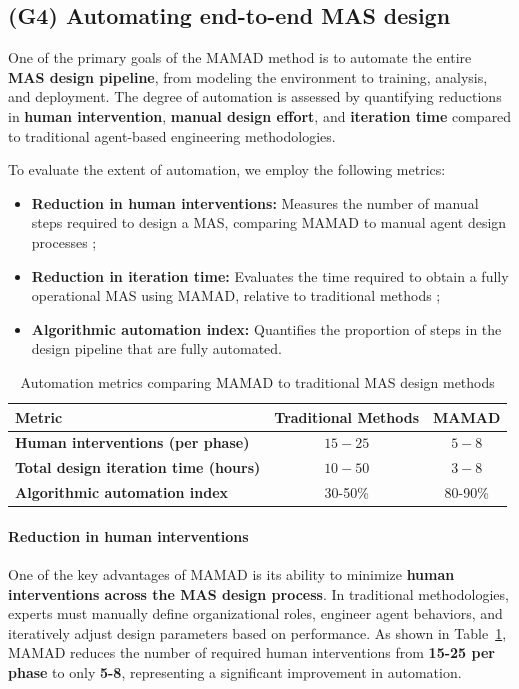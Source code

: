 \documentclass[journal]{IEEEtai}
\begin{document}
\subsection{(G4) Automating end-to-end MAS design}

One of the primary goals of the MAMAD method is to automate the entire \textbf{MAS design pipeline}, from modeling the environment to training, analysis, and deployment. The degree of automation is assessed by quantifying reductions in \textbf{human intervention}, \textbf{manual design effort}, and \textbf{iteration time} compared to traditional agent-based engineering methodologies.

To evaluate the extent of automation, we employ the following metrics:

\begin{itemize}
    \item \textbf{Reduction in human interventions:} Measures the number of manual steps required to design a MAS, comparing MAMAD to manual agent design processes ;
    \item \textbf{Reduction in iteration time:} Evaluates the time required to obtain a fully operational MAS using MAMAD, relative to traditional methods ;
    \item \textbf{Algorithmic automation index:} Quantifies the proportion of steps in the design pipeline that are fully automated.
\end{itemize}

\begin{table}[h!]
    \centering
    \caption{Automation metrics comparing MAMAD to traditional MAS design methods}
    \begin{tabular}{|l|c|c|}
        \hline
        \textbf{Metric} & \textbf{Traditional Methods} & \textbf{MAMAD} \\
        \hline
        \textbf{Human interventions (per phase)} & $15 - 25$ & $5 - 8$ \\
        \hline
        \textbf{Total design iteration time (hours)} & $10 - 50$ & $3 - 8$ \\
        \hline
        \textbf{Algorithmic automation index} & 30-50\% & 80-90\% \\
        \hline
    \end{tabular}
    \label{tab:automation}
\end{table}

\paragraph{Reduction in human interventions}
One of the key advantages of MAMAD is its ability to minimize \textbf{human interventions across the MAS design process}. In traditional methodologies, experts must manually define organizational roles, engineer agent behaviors, and iteratively adjust design parameters based on performance. As shown in Table~\ref{tab:automation}, MAMAD reduces the number of required human interventions from \textbf{15-25 per phase} to only \textbf{5-8}, representing a significant improvement in automation.
\end{document}
